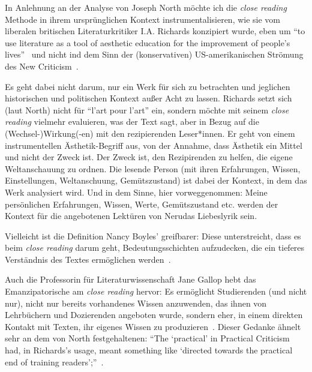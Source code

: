 In Anlehnung an der Analyse von Joseph North möchte ich die \textit{close reading} Methode in ihrem ursprünglichen Kontext instrumentalisieren, wie sie vom liberalen britischen Literaturkritiker I.A. Richards konzipiert wurde, eben um ``to use literature as a tool of aesthetic education for the improvement of people's lives''~\cite{North2013}
und nicht ind dem Sinn der (konservativen) US-amerikanischen Strömung des New Criticism~\cite{North2013}.

Es geht dabei nicht darum, nur ein Werk für sich zu betrachten und jeglichen historischen und politischen Kontext außer Acht zu lassen.
Richards setzt sich (laut North) nicht für ``l'art pour l'art'' ein, sondern möchte mit seinem \textit{close reading} vielmehr evaluieren, was der Text sagt, aber in Bezug auf die (Wechsel-)Wirkung(-en) mit den rezipierenden Leser*innen.
Er geht von einem instrumentellen Ästhetik-Begriff aus, von der Annahme, dass Ästhetik ein Mittel und nicht der Zweck ist.
Der Zweck ist, den Rezipirenden zu helfen, die eigene Weltanschauung zu ordnen.
Die lesende Person (mit ihren Erfahrungen, Wissen, Einstellungen, Weltanschuung, Gemütszustand) ist dabei der Kontext, in dem das Werk analysiert wird.
Und in dem Sinne, hier vorweggenommen:
Meine persönlichen Erfahrungen, Wissen, Werte, Gemütszustand etc. werden der Kontext für die angebotenen Lektüren von Nerudas Liebeslyrik sein.

Vielleicht ist die Definition Nancy Boyles' greifbarer: 
Diese unterstreicht, dass es beim \textit{close reading} darum geht, Bedeutungsschichten aufzudecken, die ein tieferes Verständnis des Textes ermöglichen werden~\cite[S. 90]{Boyles2016}.

Auch die Professorin für Literaturwissenschaft Jane Gallop hebt das Emanzipatorische am \textit{close reading} hervor:
Es ermöglicht Studierenden (und nicht nur), nicht nur bereits vorhandenes Wissen anzuwenden, das ihnen von Lehrbüchern und Dozierenden angeboten wurde, sondern eher, in einem direkten Kontakt mit Texten, ihr eigenes Wissen zu produzieren~\cite{Gallop2007}.
Dieser Gedanke ähnelt sehr an dem von North festgehaltenen: ``The `practical' in Practical Criticism had, in Richards’s usage, meant something like `directed towards the practical end of training readers';''~\cite{North2013}.


